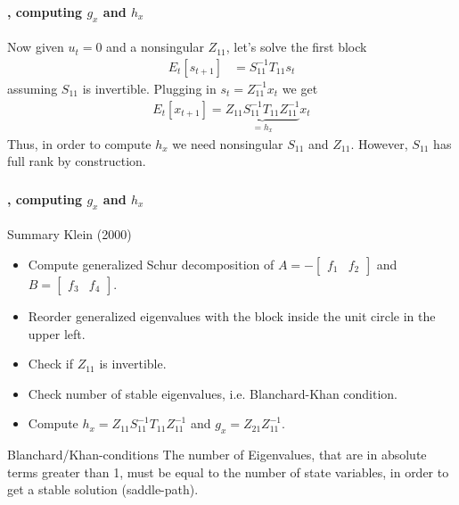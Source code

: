 \documentclass[handout]{beamer}  %
\begin{document}
\begin{frame}
\frametitle{\secname}\framesubtitle{\subsecname, computing $g_x$ and $h_x$}
Now given $u_t=0$ and a nonsingular $Z_{11}$, let's solve the first block
\begin{align*}
   E_t[s_{t+1}] &= S_{11}^{-1} T_{11} s_t
\end{align*}
assuming $S_{11}$ is invertible. Plugging in $s_t = Z_{11}^{-1} x_t$ we get
\begin{align*}
   E_t[ x_{t+1}] = \underbrace{Z_{11} S_{11}^{-1} T_{11} Z_{11}^{-1}}_{=h_x} x_t
\end{align*}
Thus, in order to compute $h_x$ we need nonsingular $S_{11}$ and $Z_{11}$. However, $S_{11}$ has full rank by construction.
\end{frame}

\begin{frame}
\frametitle{\secname}\framesubtitle{\subsecname, computing $g_x$ and $h_x$}\footnotesize
\begin{block}{Summary Klein (2000)}
\begin{itemize}
  \item Compute generalized Schur decomposition of $A=-\begin{bmatrix} f_1 & f_2\end{bmatrix}$ and $B=\begin{bmatrix} f_3 & f_4\end{bmatrix}$.
  \item Reorder generalized eigenvalues with the block inside the unit circle in the upper left.
  \item Check if $Z_{11}$ is invertible.
  \item Check number of stable eigenvalues, i.e. Blanchard-Khan condition.
  \item Compute $h_x=Z_{11} S_{11}^{-1} T_{11} Z_{11}^{-1}$ and $g_x=Z_{21} Z_{11}^{-1}$.
\end{itemize}
\end{block}
\begin{block}{Blanchard/Khan-conditions}
The number of Eigenvalues, that are in absolute terms greater than 1, must be equal to the number of state variables, in order to get a stable solution (saddle-path).
\end{block}
\end{frame}
\end{document}
